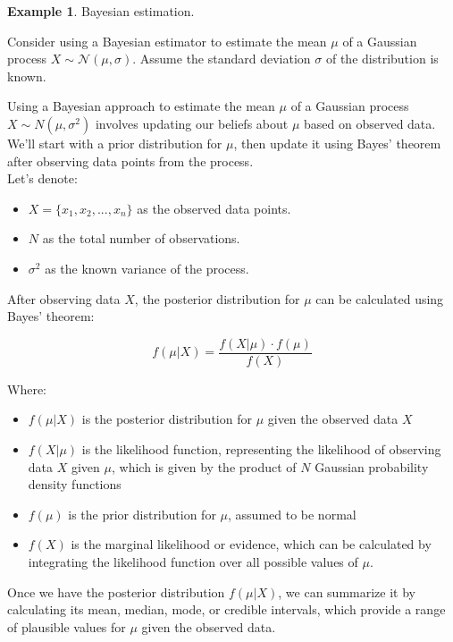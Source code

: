 \documentclass[12pt]{book}
\theoremstyle{definition}
\newtheorem{exmp}{Example}[chapter]
\begin{document}
\bigskip

\begin{tcolorbox}
    \begin{exmp}{Bayesian estimation.}

    Consider using a Bayesian estimator to estimate the mean $\mu$ of a Gaussian process \(X \sim \mathcal{N}(\mu,\sigma)\). Assume  the standard deviation $\sigma$ of the distribution is known.
    \end{exmp}
\end{tcolorbox}

Using a Bayesian approach to estimate the mean \(\mu\) of a Gaussian process \(X \sim N(\mu, \sigma^2)\) involves updating our beliefs about \(\mu\) based on observed data. We'll start with a prior distribution for \(\mu\), then update it using Bayes' theorem after observing data points from the process.\\

Let's denote:
\begin{itemize}
    \item \(X = \{x_1, x_2, ..., x_n\}\) as the observed data points.
    \item \(N\) as the total number of observations.
    \item \(\sigma^2\) as the known variance of the process.
\end{itemize}

After observing data \(X\), the posterior distribution for \(\mu\) can be calculated using Bayes' theorem:

\[ f(\mu | X) = \frac{f(X | \mu) \cdot f(\mu)}{f(X)} \]

Where:
\begin{itemize}
    \item \( f(\mu | X) \) is the posterior distribution for \(\mu\) given the observed data \(X\)
    \item \( f(X | \mu) \) is the likelihood function, representing the likelihood of observing data \(X\) given \(\mu\), which is given by the product of \(N\) Gaussian probability density functions
    \item \( f(\mu) \) is the prior distribution for \(\mu\), assumed to be normal
    \item \( f(X) \) is the marginal likelihood or evidence, which can be calculated by integrating the likelihood function over all possible values of \(\mu\).
\end{itemize}


Once we have the posterior distribution \( f(\mu | X) \), we can summarize it by calculating its mean, median, mode, or credible intervals, which provide a range of plausible values for \(\mu\) given the observed data. \\
\end{document}
